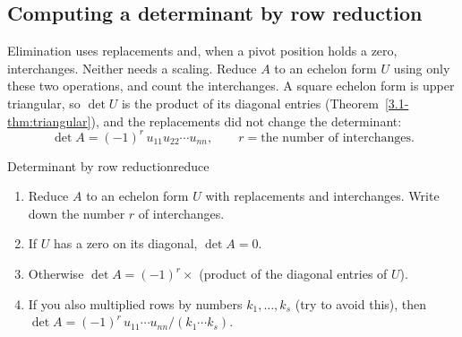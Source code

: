 \documentclass[11pt]{article}
\begin{document}
\subsection*{Computing a determinant by row reduction}

Elimination uses replacements and, when a pivot position holds a zero, interchanges. Neither needs a scaling. Reduce $A$ to an echelon form $U$ using only these two operations, and count the interchanges. A square echelon form is upper triangular, so $\det U$ is the product of its diagonal entries (Theorem~\ref{3.1-thm:triangular}), and the replacements did not change the determinant:
\[
\det A=(-1)^{r}\,u_{11}u_{22}\cdots u_{nn},\qquad r=\text{the number of interchanges.}
\]

\begin{proc}{Determinant by row reduction}{reduce}
\begin{enumerate}
  \item Reduce $A$ to an echelon form $U$ with replacements and interchanges. Write down the number $r$ of interchanges.
  \item If $U$ has a zero on its diagonal, $\det A=0$.
  \item Otherwise $\det A=(-1)^r\times$ (product of the diagonal entries of $U$).
  \item If you also multiplied rows by numbers $k_1,\dots,k_s$ (try to avoid this), then $\det A=(-1)^r\,u_{11}\cdots u_{nn}\big/(k_1\cdots k_s)$.
\end{enumerate}
\end{proc}
\end{document}
